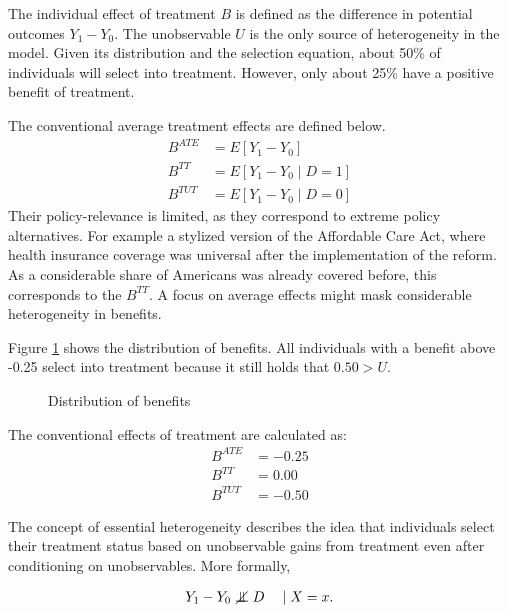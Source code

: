 \begin{boenumerate}

\item The individual effect of treatment $B$ is defined as the difference in potential outcomes $Y_1 - Y_0$. The unobservable $U$ is the only source of heterogeneity in the model. Given its distribution and the selection equation, about 50\% of individuals will select into treatment. However, only about 25\% have a positive benefit of treatment.

\item The conventional average treatment effects are defined below.
%
\begin{align*}
    B^{ATE} & = E[Y_1 - Y_0 ]\\
    B^{TT}  & = E[Y_1 - Y_0 \mid D = 1]\\
    B^{TUT} & = E[Y_1 - Y_0 \mid D = 0]
\end{align*}
%
Their policy-relevance is limited, as they correspond to extreme policy alternatives. For example a stylized version of the Affordable Care Act, where health insurance coverage was universal after the implementation of the reform. As a considerable share of Americans was already covered before, this corresponds to the $B^{TT}$. A focus on average effects might mask considerable heterogeneity in benefits.

Figure \ref{Distribution of benefits} shows the distribution of benefits. All individuals with a benefit above -0.25 select into treatment because it still holds that $0.50 > U$.

\begin{figure}[htp]\centering
\caption{Distribution of benefits}\label{Distribution of benefits}
\end{figure}

The conventional effects of treatment are calculated as:
%
\begin{align*}
    B^{ATE} & = -0.25 \\
    B^{TT}  & =  0.00\\
    B^{TUT} & = -0.50
\end{align*}


\item The concept of essential heterogeneity describes the idea that individuals select their treatment status based on unobservable gains from treatment even after conditioning on unobservables. More formally,

\begin{align*}
    Y_1 - Y_0 \notindep D\quad \mid X = x.
\end{align*}


\end{boenumerate}
